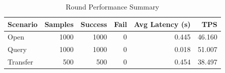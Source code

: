 \begin{table}
\caption{Round Performance Summary}
\label{tab:round_perf}
\begin{tabular}{lrrrrr}
\toprule
Scenario & Samples & Success & Fail & Avg Latency (s) & TPS \\
\midrule
Open & 1000 & 1000 & 0 & 0.445 & 46.160 \\
Query & 1000 & 1000 & 0 & 0.018 & 51.007 \\
Transfer & 500 & 500 & 0 & 0.454 & 38.497 \\
\bottomrule
\end{tabular}
\end{table}
